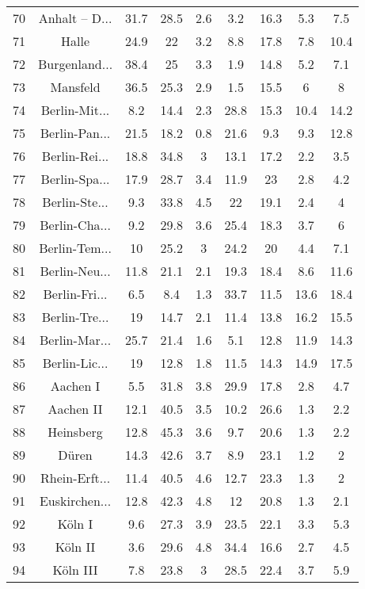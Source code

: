 \begin{table}[!htbp]
\begin{tabular}{@{\extracolsep{5pt}} ccccccccc}
70 & Anhalt – D... & 31.7 & 28.5 & 2.6 & 3.2 & 16.3 & 5.3 & 7.5 \\ 
71 & Halle & 24.9 & 22 & 3.2 & 8.8 & 17.8 & 7.8 & 10.4 \\ 
72 & Burgenland... & 38.4 & 25 & 3.3 & 1.9 & 14.8 & 5.2 & 7.1 \\ 
73 & Mansfeld & 36.5 & 25.3 & 2.9 & 1.5 & 15.5 & 6 & 8 \\ 
74 & Berlin-Mit... & 8.2 & 14.4 & 2.3 & 28.8 & 15.3 & 10.4 & 14.2 \\ 
75 & Berlin-Pan... & 21.5 & 18.2 & 0.8 & 21.6 & 9.3 & 9.3 & 12.8 \\ 
76 & Berlin-Rei... & 18.8 & 34.8 & 3 & 13.1 & 17.2 & 2.2 & 3.5 \\ 
77 & Berlin-Spa... & 17.9 & 28.7 & 3.4 & 11.9 & 23 & 2.8 & 4.2 \\ 
78 & Berlin-Ste... & 9.3 & 33.8 & 4.5 & 22 & 19.1 & 2.4 & 4 \\ 
79 & Berlin-Cha... & 9.2 & 29.8 & 3.6 & 25.4 & 18.3 & 3.7 & 6 \\ 
80 & Berlin-Tem... & 10 & 25.2 & 3 & 24.2 & 20 & 4.4 & 7.1 \\ 
81 & Berlin-Neu... & 11.8 & 21.1 & 2.1 & 19.3 & 18.4 & 8.6 & 11.6 \\ 
82 & Berlin-Fri... & 6.5 & 8.4 & 1.3 & 33.7 & 11.5 & 13.6 & 18.4 \\ 
83 & Berlin-Tre... & 19 & 14.7 & 2.1 & 11.4 & 13.8 & 16.2 & 15.5 \\ 
84 & Berlin-Mar... & 25.7 & 21.4 & 1.6 & 5.1 & 12.8 & 11.9 & 14.3 \\ 
85 & Berlin-Lic... & 19 & 12.8 & 1.8 & 11.5 & 14.3 & 14.9 & 17.5 \\ 
86 & Aachen I & 5.5 & 31.8 & 3.8 & 29.9 & 17.8 & 2.8 & 4.7 \\ 
87 & Aachen II & 12.1 & 40.5 & 3.5 & 10.2 & 26.6 & 1.3 & 2.2 \\ 
88 & Heinsberg & 12.8 & 45.3 & 3.6 & 9.7 & 20.6 & 1.3 & 2.2 \\ 
89 & Düren & 14.3 & 42.6 & 3.7 & 8.9 & 23.1 & 1.2 & 2 \\ 
90 & Rhein-Erft... & 11.4 & 40.5 & 4.6 & 12.7 & 23.3 & 1.3 & 2 \\ 
91 & Euskirchen... & 12.8 & 42.3 & 4.8 & 12 & 20.8 & 1.3 & 2.1 \\ 
92 & Köln I & 9.6 & 27.3 & 3.9 & 23.5 & 22.1 & 3.3 & 5.3 \\ 
93 & Köln II & 3.6 & 29.6 & 4.8 & 34.4 & 16.6 & 2.7 & 4.5 \\ 
94 & Köln III & 7.8 & 23.8 & 3 & 28.5 & 22.4 & 3.7 & 5.9 \\ 

\end{tabular}
\end{table}
